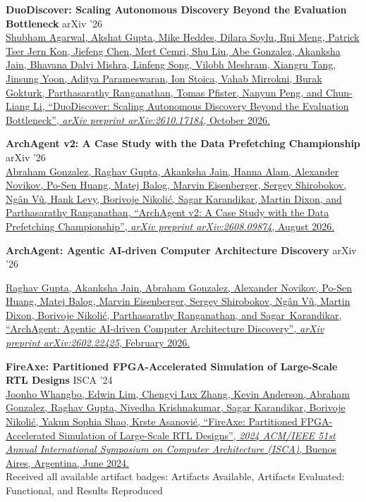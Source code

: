 \documentclass[line]{res}
\begin{document}
\begin{resume}
\textbf{DuoDiscover: Scaling Autonomous Discovery Beyond the Evaluation Bottleneck} \hfill arXiv '26
\vspace{0.7mm}
\\
\href{https://arxiv.org/abs/2610.17184}{Shubham Agarwal, Akshat Gupta, Mike Heddes, Dilara Soylu, Rui Meng, Patrick Tser Jern Kon, Jiefeng Chen, Mert Cemri, Shu Liu, \underline{Abe Gonzalez}, Akanksha Jain, Bhavana Dalvi Mishra, Linfeng Song, Vilobh Meshram, Xiangru Tang, Jinsung Yoon, Aditya Parameswaran, Ion Stoica, Vahab Mirrokni, Burak Gokturk, Parthasarathy Ranganathan, Tomas Pfister, Nanyun Peng, and Chun-Liang Li, ``DuoDiscover: Scaling Autonomous Discovery Beyond the Evaluation Bottleneck'', \textit{arXiv preprint arXiv:2610.17184}, October 2026.}
\vspace{-0.8mm}

\textbf{ArchAgent v2: A Case Study with the Data Prefetching Championship} \hfill arXiv '26
\vspace{0.7mm}
\\
\href{https://arxiv.org/abs/2608.09874}{\underline{Abraham Gonzalez}, Raghav Gupta, Akanksha Jain, Hanna Alam, Alexander Novikov, Po-Sen Huang, Matej Balog, Marvin Eisenberger, Sergey Shirobokov, Ng\^an V\~u, Hank Levy, Borivoje Nikoli\'c, Sagar Karandikar, Martin Dixon, and Parthasarathy Ranganathan, ``ArchAgent v2: A Case Study with the Data Prefetching Championship'', \textit{arXiv preprint arXiv:2608.09874}, August 2026.}
\vspace{-0.8mm}

\textbf{ArchAgent: Agentic AI-driven Computer Architecture Discovery} \hfill arXiv '26
\vspace{0.7mm}
\\
{\raggedright
\href{https://arxiv.org/abs/2602.22425}{Raghav Gupta, Akanksha Jain, \underline{Abraham Gonzalez}, Alexander Novikov, Po-Sen Huang, Matej Balog, Marvin Eisenberger, Sergey Shirobokov, Ng\^an V\~u, Martin Dixon, Borivoje Nikoli\'c, Parthasarathy Ranganathan, and Sagar~Karandikar, ``ArchAgent: Agentic AI-driven Computer Architecture Discovery'', \textit{arXiv preprint arXiv:2602.22425}, February 2026.}
\par}
\vspace{-1.5mm}

\newpage

\textbf{FireAxe: Partitioned FPGA-Accelerated Simulation of Large-Scale RTL Designs} \hfill ISCA '24
\vspace{0.7mm}
\\
\href{https://ieeexplore.ieee.org/document/10609699}{Joonho Whangbo, Edwin Lim, Chengyi Lux Zhang, Kevin Anderson, \underline{Abraham Gonzalez}, Raghav Gupta, Nivedha Krishnakumar, Sagar Karandikar, Borivoje Nikoli\'c, Yakun Sophia Shao, Krste Asanovi\'c, ``FireAxe: Partitioned FPGA-Accelerated Simulation of Large-Scale RTL Designs'', \textit{2024 ACM/IEEE 51st Annual International Symposium on Computer Architecture (ISCA)}, Buenos Aires, Argentina, June 2024.}
\\
Received all available artifact badges: Artifacts Available, Artifacts Evaluated: Functional, and Results Reproduced
\vspace{-0.8mm}


\end{resume}
\end{document}
